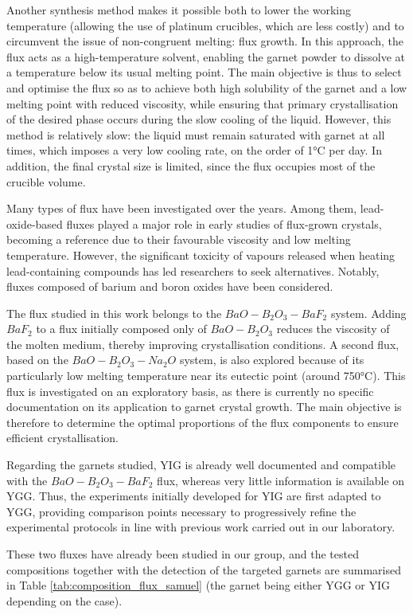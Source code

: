 \documentclass{rapportENSCP}
\begin{document}
Another synthesis method makes it possible both to lower the working temperature (allowing the use of platinum crucibles, which are less costly) and to circumvent the issue of non-congruent melting: flux growth. In this approach, the flux acts as a high-temperature solvent, enabling the garnet powder to dissolve at a temperature below its usual melting point. The main objective is thus to select and optimise the flux so as to achieve both high solubility of the garnet and a low melting point with reduced viscosity, while ensuring that primary crystallisation of the desired phase occurs during the slow cooling of the liquid. However, this method is relatively slow: the liquid must remain saturated with garnet at all times, which imposes a very low cooling rate, on the order of 1°C per day. In addition, the final crystal size is limited, since the flux occupies most of the crucible volume.

Many types of flux have been investigated over the years. Among them, lead-oxide-based fluxes played a major role in early studies of flux-grown crystals, becoming a reference due to their favourable viscosity and low melting temperature. However, the significant toxicity of vapours released when heating lead-containing compounds has led researchers to seek alternatives. Notably, fluxes composed of barium and boron oxides have been considered.

The flux studied in this work belongs to the $BaO-B_2O_3-BaF_2$ system. Adding $BaF_2$ to a flux initially composed only of $BaO-B_2O_3$ reduces the viscosity of the molten medium, thereby improving crystallisation conditions. A second flux, based on the $BaO-B_2O_3-Na_2O$ system, is also explored because of its particularly low melting temperature near its eutectic point (around 750°C). This flux is investigated on an exploratory basis, as there is currently no specific documentation on its application to garnet crystal growth. The main objective is therefore to determine the optimal proportions of the flux components to ensure efficient crystallisation.

Regarding the garnets studied, YIG is already well documented and compatible with the $BaO-B_2O_3-BaF_2$ flux, whereas very little information is available on YGG. Thus, the experiments initially developed for YIG are first adapted to YGG, providing comparison points necessary to progressively refine the experimental protocols in line with previous work carried out in our laboratory.

These two fluxes have already been studied in our group, and the tested compositions together with the detection of the targeted garnets are summarised in Table \ref{tab:composition_flux_samuel} (the garnet being either YGG or YIG depending on the case).
\end{document}
